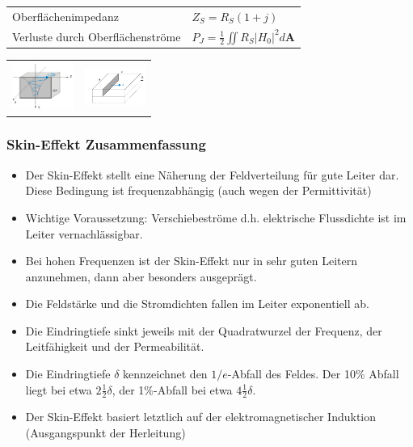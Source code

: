 \documentclass[english]{latex4ei/latex4ei_sheet}
\begin{document}
\begin{sectionbox}
\begin{tabular*}{\columnwidth}{ll}
	Oberflächenimpedanz & $Z_S = R_S(1+j)$ \\
	Verluste durch Oberflächenströme & $P_J = \frac{1}{2} \iint R_S |H_0|^2 d\mathbf{A}$ \\
\end{tabular*}
\begin{tabular*}{\columnwidth}{ll}
\includegraphics[width = 2cm]{./img/skin_effekt.png} & \includegraphics[width = 2cm]{./img/skin_effekt_verlust.png}\\
\end{tabular*}
\end{sectionbox}
\begin{sectionbox}
\subsubsection{Skin-Effekt Zusammenfassung}
\begin{itemize}
	\item Der Skin-Effekt stellt eine Näherung der Feldverteilung für gute Leiter dar. Diese Bedingung ist frequenzabhängig (auch wegen der Permittivität)
	\item Wichtige Voraussetzung: Verschiebeströme d.h. elektrische Flussdichte ist im Leiter vernachlässigbar.
	\item Bei hohen Frequenzen ist der Skin-Effekt nur in sehr guten Leitern anzunehmen, dann aber besonders ausgeprägt.
	\item Die Feldstärke und die Stromdichten fallen im Leiter exponentiell ab.
	\item Die Eindringtiefe sinkt jeweils mit der Quadratwurzel der Frequenz, der Leitfähigkeit und der Permeabilität.
	\item Die Eindringtiefe $\delta$ kennzeichnet den $1/e$-Abfall des Feldes. Der 10\% Abfall liegt bei etwa $2 \frac{1}{2} \delta$, der 1\%-Abfall bei etwa $4 \frac{1}{2} \delta$.
	\item Der Skin-Effekt basiert letztlich auf der elektromagnetischer Induktion (Ausgangspunkt der Herleitung)
\end{itemize}
\end{sectionbox}
\end{document}
